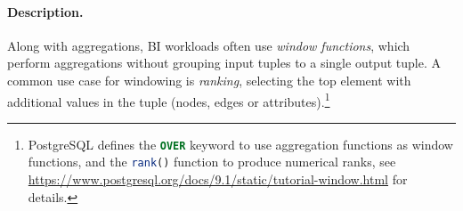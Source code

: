 
\paragraph{Description.}

Along with aggregations, BI workloads often use \emph{window functions}, which
perform aggregations without grouping input tuples to a single output tuple.  A
common use case for windowing is \emph{ranking}, \ie selecting the top element
with additional values in the tuple (nodes, edges or
attributes).\footnote{PostgreSQL defines the \lstinline[language=sql]{OVER}
keyword to use aggregation functions as window functions, and the
\lstinline[language=sql]{rank()} function to produce numerical ranks, see
\url{https://www.postgresql.org/docs/9.1/static/tutorial-window.html} for
details.}



